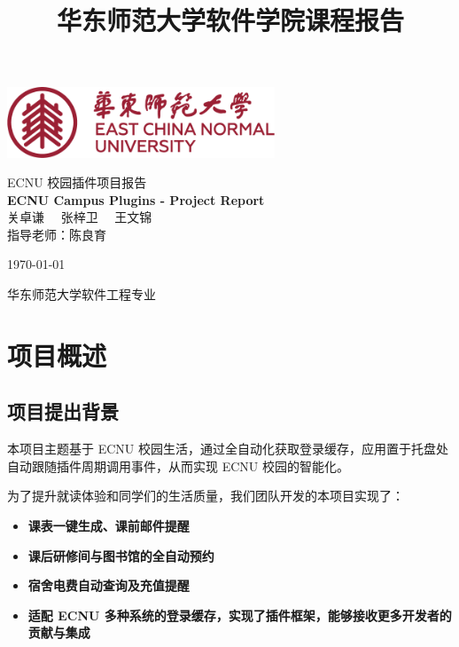 \documentclass[14pt,a4paper,UTF8,twoside]{article}
\date{} %
\title{华东师范大学软件学院课程报告} %
\begin{document}
\begin{titlepage}
    \centering
    \vspace*{2cm}
    
    \includegraphics[width=0.6\textwidth]{img/ECNULogo.png}\par\vspace{1cm}
    
    {\heiti {} ECNU 校园插件项目报告}\\[1.5cm] 
    
    {\bfseries{} ECNU Campus Plugins - Project Report}\\[1.5cm]

    {\kaishu {} 关卓谦 \ \ 张梓卫 \ \ 王文锦}\\[1cm]
    
    { 指导老师：陈良育}\\[1cm] 
    
    \vfill
    
    { \today}
    
    \vspace{1cm}
    
    { 华东师范大学软件工程专业}

\end{titlepage}

\newpage{}

\tableofcontents

\newpage{}

\section{项目概述}

\subsection{项目提出背景}

\begin{Implementation}{}{}

本项目主题基于 ECNU 校园生活，通过全自动化获取登录缓存，应用置于托盘处自动跟随插件周期调用事件，从而实现 ECNU 校园的智能化。

\vspace{0.3cm}

为了提升就读体验和同学们的生活质量，我们团队开发的本项目实现了：

\begin{itemize}
    \item \textbf{课表一键生成、课前邮件提醒}
    \item \textbf{课后研修间与图书馆的全自动预约}
    \item \textbf{宿舍电费自动查询及充值提醒}
    \item \textbf{适配 ECNU 多种系统的登录缓存，实现了插件框架，能够接收更多开发者的贡献与集成}
\end{itemize}

\end{Implementation}
\end{document}
